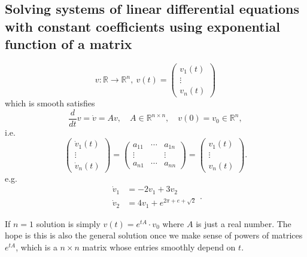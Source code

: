 \documentclass[a4paper]{article}
\theoremstyle{definition}
\begin{document}
\subsection{Solving systems of linear differential equations with constant coefficients using exponential function of a matrix}
\[
v:\mathbb R \rightarrow \mathbb R^n,\ v(t)=\begin{pmatrix}v_1(t)\\ \vdots \\ v_n(t) \end{pmatrix}
\]
which is smooth satisfies
\[
\frac{d}{dt}v=\dot v = Av,\quad A\in \mathbb R^{n\times n},\quad v(0)=v_0\in \mathbb R^n ,
\]
i.e.
\[
\begin{pmatrix}\dot v_1(t)\\ \vdots \\ \dot v_n(t) \end{pmatrix}=\begin{pmatrix}a_{11}&\cdots & a_{1n}\\ \vdots & & \vdots \\ a_{n1} & \cdots & a_{nn}\end{pmatrix}=\begin{pmatrix}v_1(t)\\ \vdots \\ v_n(t) \end{pmatrix} .
\]
e.g.
\[
\begin{aligned}\dot v_1 &=-2v_1+3v_2\\ \dot v_2 &= 4v_1+e^{2\pi+ e+\sqrt 2} \end{aligned} .
\]

If $n=1$ solution is simply $v(t)=e^{tA}\cdot v_0$ where $A$ is just a real number. The hope is this is also the general solution once we make sense of powers of matrices $e^{tA}$, which is a $n\times n$ matrix whose entries smoothly depend on $t$.
\end{document}
